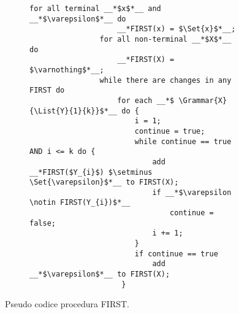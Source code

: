 \documentclass{subfiles}
\begin{document}
\begin{figure}[h!]
    \centering
    \begin{subfigure}[b]{0.55\textwidth}
        \begin{lstlisting}[language = PSEUDO]
                for all terminal __*$x$*__ and __*$\varepsilon$*__ do
                    __*FIRST(x) = $\Set{x}$*__;
                for all non-terminal __*$X$*__ do
                    __*FIRST(X) = $\varnothing$*__;
                while there are changes in any FIRST do
                    for each __*$ \Grammar{X}{\List{Y}{1}{k}}$*__ do {
                        i = 1;
                        continue = true;
                        while continue == true AND i <= k do {
                            add __*FIRST($Y_{i}$) $\setminus \Set{\varepsilon}$*__ to FIRST(X);
                            if __*$\varepsilon \notin FIRST(Y_{i})$*__
                                continue = false;
                            i += 1;
                        }
                        if continue == true
                            add __*$\varepsilon$*__ to FIRST(X);
                     }
            \end{lstlisting}
    \end{subfigure}
    \caption{Pseudo codice procedura FIRST.}
    \label{fig:3}
\end{figure}
\end{document}
